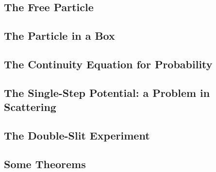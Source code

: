 \subsection{The Free Particle}

\subsection{The Particle in a Box}

\subsection{The Continuity Equation for Probability}

\subsection{The Single-Step Potential: a Problem in Scattering}

\subsection{The Double-Slit Experiment}

\subsection{Some Theorems}
